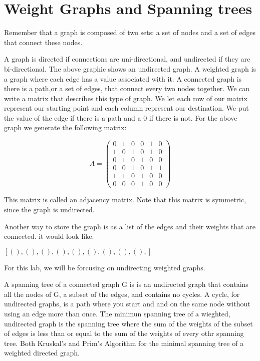 \label{Ch:Kruskal}


\section*{Weight Graphs and Spanning trees}


Remember that a graph is composed of two sets: a set of nodes and a set of edges that connect these nodes. 

A graph is directed if connections are uni-directional, and undirected if they are bi-directional. The above graphic shows an undirected graph. A weighted graph is a graph where each edge has a value associated with it. A connected graph is there is a path,or a set of edges, that connect every two nodes together. We can write a matrix that describes this type of graph. We let each row of our matrix represent our starting point and each column represent our destination. We put the value of the edge if there is a path and a 0 if there is not. For the above graph we generate the following matrix:

\[
A = \begin{pmatrix}
0 & 1 & 0 & 0 & 1 & 0\\
1 & 0 & 1 & 0 & 1 & 0\\
0 & 1 & 0 & 1 & 0 & 0\\
0 & 0 & 1 & 0 & 1 & 1\\
1 & 1 & 0 & 1 & 0 & 0\\
0 & 0 & 0 & 1 & 0 & 0
\end{pmatrix}
\]

This matrix is called an adjacency matrix. Note that this matrix is symmetric, since the graph is undirected. 

Another way to store the graph is as a list of the edges and their weights that are connected. it would look like.

$[(   ),
 (   ),
 (   ),
 (   ),
 (   ),
 (   ),
 (   ),
 (   ),
 (   ),]$

For this lab, we will be forcusing on undirecting weighted graphs. 

A spanning tree of a connected graph G is is an undirected graph that contains all the nodes of G, a subset of the edges, and contains no cycles. A cycle, for undirected graphs, is a path where you start and and on the same node without using an edge more than once. The minimun spanning tree of a wieghted, undirected graph is the spanning tree where the sum of the weights of the subset of edges is less than or equal to the sum of the weights of every othr spanning tree. Both Kruskal's and Prim's Algorithm for the minimal spanning tree of a weighted directed graph.

